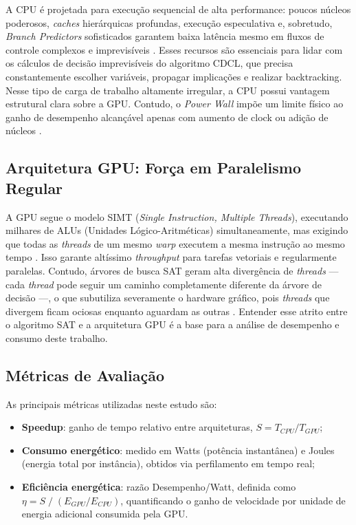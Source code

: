 \documentclass[12pt]{article}
\begin{document}
A CPU é projetada para execução sequencial de alta performance: poucos núcleos poderosos, \textit{caches} hierárquicas profundas, execução especulativa e, sobretudo, \textit{Branch Predictors} sofisticados garantem baixa latência mesmo em fluxos de controle complexos e imprevisíveis \cite{hennessy:2017}. Esses recursos são essenciais para lidar com os cálculos de decisão imprevisíveis do algoritmo CDCL, que precisa constantemente escolher variáveis, propagar implicações e realizar backtracking. Nesse tipo de carga de trabalho altamente irregular, a CPU possui vantagem estrutural clara sobre a GPU. Contudo, o \textit{Power Wall} impõe um limite físico ao ganho de desempenho alcançável apenas com aumento de clock ou adição de núcleos \cite{hennessy:2017}.

\subsection{Arquitetura GPU: Força em Paralelismo Regular}

A GPU segue o modelo SIMT (\textit{Single Instruction, Multiple Threads}), executando milhares de ALUs (Unidades Lógico-Aritméticas) simultaneamente, mas exigindo que todas as \textit{threads} de um mesmo \textit{warp} executem a mesma instrução ao mesmo tempo \cite{kirk:2016}. Isso garante altíssimo \textit{throughput} para tarefas vetoriais e regularmente paralelas. Contudo, árvores de busca SAT geram alta divergência de \textit{threads} — cada \textit{thread} pode seguir um caminho completamente diferente da árvore de decisão —, o que subutiliza severamente o hardware gráfico, pois \textit{threads} que divergem ficam ociosas enquanto aguardam as outras \cite{kirk:2016}. Entender esse atrito entre o algoritmo SAT e a arquitetura GPU é a base para a análise de desempenho e consumo deste trabalho.

\subsection{Métricas de Avaliação}

As principais métricas utilizadas neste estudo são:

\begin{itemize}
  \item \textbf{Speedup}: ganho de tempo relativo entre arquiteturas, $S = T_{CPU} / T_{GPU}$;
  \item \textbf{Consumo energético}: medido em Watts (potência instantânea) e Joules (energia total por instância), obtidos via perfilamento em tempo real;
  \item \textbf{Eficiência energética}: razão Desempenho/Watt, definida como $\eta = S \;/\; (E_{GPU} / E_{CPU})$, quantificando o ganho de velocidade por unidade de energia adicional consumida pela GPU.
\end{itemize}
\end{document}
